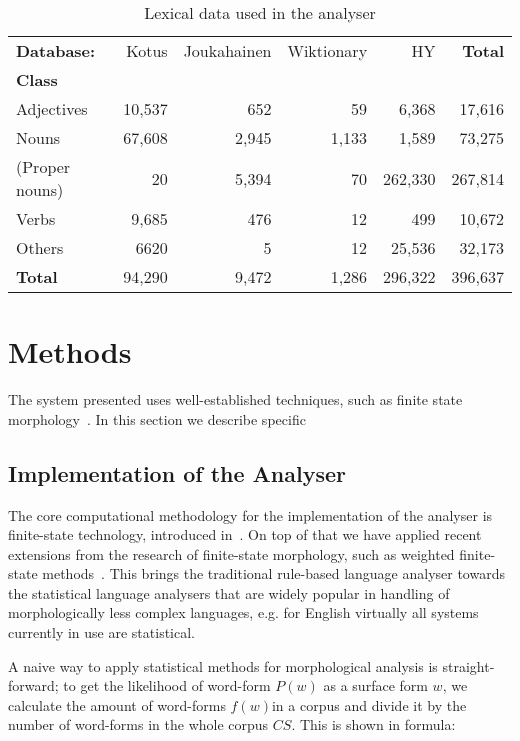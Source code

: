 \documentclass[a4paper,12pt]{article}
\begin{document}
\begin{table}
  \centering
    \begin{tabular}{|l|r|r|r|r||r|}
        \hline
        \bf Database: & Kotus & Joukahainen & Wiktionary & HY & \bf Total \\
        \bf Class   & & & & & \\
        \hline
        Adjectives     & 10,537 & 652 & 59 & 6,368 & 17,616 \\
        Nouns          & 67,608 & 2,945 & 1,133 & 1,589 & 73,275\\
        (Proper nouns) & 20 & 5,394 & 70 & 262,330 & 267,814\\
        Verbs          & 9,685 & 476 & 12 & 499 & 10,672\\
        Others         & 6620 & 5 & 12 & 25,536 & 32,173 \\
        \hline
        \bf Total      & 94,290 & 9,472 & 1,286 & 296,322 & 396,637 \\
        \hline
    \end{tabular}
  \caption{Lexical data used in the analyser
  \label{table:lexical}}
\end{table}

\section{Methods}

The system presented uses well-established techniques, such as
finite state morphology~\cite{beesley2003finite}. In this section we
describe specific 

\subsection{Implementation of the Analyser}

The core computational methodology for the implementation of the analyser is
finite-state technology, introduced
in~\cite{koskenniemi1983twolevel,beesley2003finite}. On top of that we
have applied recent extensions from the research of finite-state morphology,
such as weighted finite-state methods~\cite{openfst,hfst2012}. This brings the
traditional rule-based language analyser towards the statistical language
analysers that are widely popular in handling of morphologically less
complex languages, e.g. for English virtually all systems currently in use
are statistical.

A naive way to apply statistical methods for morphological analysis is
straight-forward; to get the likelihood of word-form $P(w)$ as a surface form
$w$, we calculate the amount of word-forms $f(w)$in a corpus and divide it by
the number of word-forms in the whole corpus $CS$. This is shown in formula:
\end{document}
